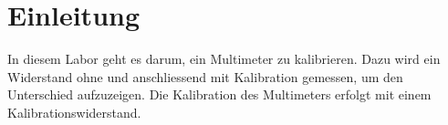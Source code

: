 \section{Einleitung}
In diesem Labor geht es darum, ein Multimeter zu kalibrieren. Dazu wird ein Widerstand ohne und anschliessend mit Kalibration gemessen, um den Unterschied aufzuzeigen. Die Kalibration des Multimeters erfolgt mit einem Kalibrationswiderstand.